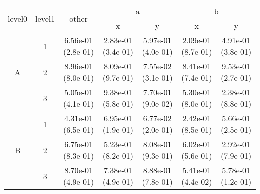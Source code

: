 \begin{tabular}{ccccccc}
\toprule
\multirow{2}{*}{level0} & \multirow{2}{*}{level1}& \multirow{2}{*}{other}&\multicolumn{2}{c}{a}&\multicolumn{2}{c}{b}\tabularnewline
\cmidrule(lr){4-5}
\cmidrule(lr){6-7}
&&&x&y&x&y\tabularnewline
\midrule
\multirow{3}{*}{A}&1& 6.56e-01 (2.8e-01)& 2.83e-01 (3.4e-01)& 5.97e-01 (4.0e-01)& 2.09e-01 (8.7e-01)& 4.91e-01 (3.8e-01)\tabularnewline
&2& 8.96e-01 (8.0e-01)& 8.09e-01 (9.7e-01)& 7.55e-02 (3.1e-01)& 8.41e-01 (7.4e-01)& 9.53e-01 (2.7e-01)\tabularnewline
&3& 5.05e-01 (4.1e-01)& 9.38e-01 (5.8e-01)& 7.70e-01 (9.0e-02)& 5.30e-01 (8.0e-01)& 2.38e-01 (8.8e-01)\tabularnewline
\midrule
\multirow{3}{*}{B}&1& 4.31e-01 (6.5e-01)& 6.95e-01 (1.9e-01)& 6.77e-02 (2.0e-01)& 2.42e-01 (8.5e-01)& 5.66e-01 (2.5e-01)\tabularnewline
&2& 6.75e-01 (8.3e-01)& 5.23e-01 (8.2e-01)& 8.08e-01 (9.3e-01)& 6.02e-01 (5.6e-01)& 2.92e-01 (7.9e-01)\tabularnewline
&3& 8.70e-01 (4.9e-01)& 7.38e-01 (4.9e-01)& 8.88e-01 (7.8e-01)& 5.41e-01 (4.4e-02)& 5.78e-01 (1.2e-01)\tabularnewline
\bottomrule
\end{tabular}
